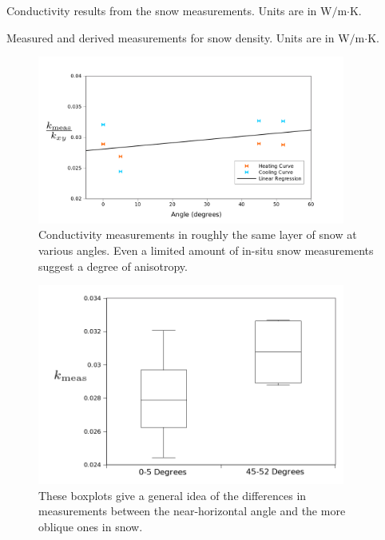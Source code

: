 \begin{table}[h]
\centering

\caption{Conductivity results from the snow measurements. Units are in W\(/\)m\(\cdot\)K.}
\label{tab:snow}
\end{table}

\begin{table}[h]
\centering

\caption{Measured and derived measurements for snow density. Units are in W\(/\)m\(\cdot\)K.}
\label{tab:density}
\end{table}

\begin{figure}[h]
\centering
\includegraphics[width=0.9\textwidth]{fig/snow_meas.png}
\caption{Conductivity measurements in roughly the same layer of snow at various 
angles. Even a limited amount of in-situ snow measurements suggest a degree of
anisotropy.}
\label{fig:snow_results}
\end{figure}

\begin{figure}[h]
\centering
\includegraphics[width=0.9\textwidth]{fig/snow_meas_boxplot.png}
\caption{These boxplots give a general idea of the differences in measurements
between the near-horizontal angle and the more oblique ones in snow.}
\label{fig:test_boxplot}
\end{figure}


